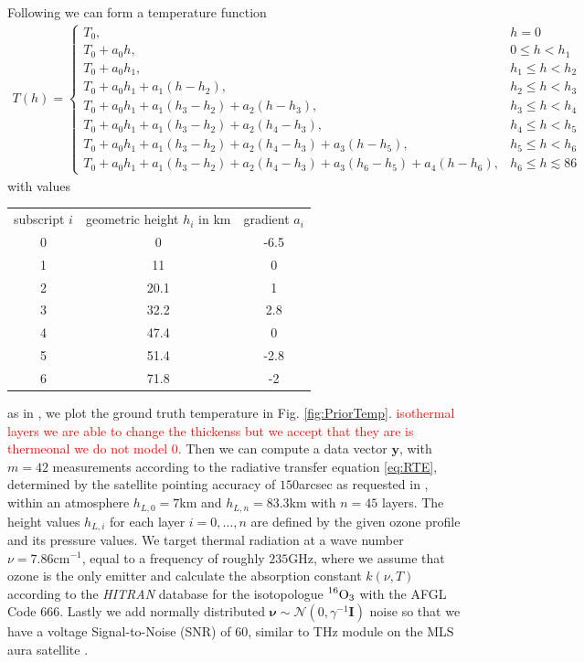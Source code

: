 Following \cite{atmosphere1976us} we can form a temperature function
\begin{align}
	T(h) = \begin{cases*}
		T_0, & \text{$h = 0$}\\
		T_0 + a_0 h , & \text{$0 \leq h < h_{1}$}\\
		T_0 + a_0 h_{1}, & \text{$h_{1} \leq  h < h_{2}$}\\
		T_0 + a_0 h_{1} + a_1 (h   - h_2),  & \text{$h_{2} \leq h < h_{3}$}\\
		T_0 + a_0 h_{1} + a_1 (h_{3} - h_{2}) + a_2 (h   - h_3), & \text{$h_{3} \leq h < h_{4}$}\\
		T_0 + a_0 h_{1} + a_1 (h_{3} - h_{2}) + a_2 (h_{4} - h_{3}), & \text{$h_{4} \leq h < h_{5}$}\\
		T_0 + a_0 h_{1} + a_1 (h_{3} - h_{2}) + a_2 (h_{4} - h_{3}) + a_3 (h   - h_{5}), & \text{$h_{5} \leq h < h_{6}$}\\
		T_0 + a_0 h_{1} + a_1 (h_{3} - h_{2}) + a_2 (h_{4} - h_{3}) + a_3 (h_{6} - h_{5}) + a_4 (h - h_{6}), & \text{$h_{6} \leq h \lesssim 86$}
	\end{cases*} 
	\label{eq:tempFunc}
\end{align}
with values
\begin{tabular}{ |c||c|c|  }
	\hline
	subscript $i$ & geometric height $h_i$ in km&gradient $a_i$\\
	\hhline{|=||=|=|}
	0& 0 & -6.5\\
	1& 11 & 0\\
	2& 20.1& 1\\
	3& 32.2& 2.8\\
	4& 47.4& 0\\
	5& 51.4& -2.8\\
	6& 71.8& -2\\
	\hline
\end{tabular}
as in \cite{atmosphere1976us}, we plot the ground truth temperature in Fig. \ref{fig:PriorTemp}.
\textcolor{red}{isothermal layers we are able to change the thickenss but we accept that they are is thermeonal we do not model 0.}
Then we can compute a data vector $\bm{y}$, with $m = 42$ measurements according to the radiative transfer equation \ref{eq:RTE}, determined by the satellite pointing accuracy of $150$arcsec as requested in \cite{CubeSatInternal}, within an atmosphere $h_{L,0}=7$km and $h_{L,n} = 83.3$km with $n = 45$ layers.
The height values $h_{L,i}$ for each layer $i = 0,\dots, n$ are defined by the given ozone profile and its pressure values.
We target thermal radiation at a wave number $\nu = 7.86\text{cm}^{-1}$, equal to a frequency of roughly $235$GHz, where we assume that ozone is the only emitter and calculate the absorption constant $k(\nu,T)$ according to the \textit{HITRAN} database \cite{gordon2022hitran2020} for the isotopologue $\prescript{16}{}{\text{O}}_3$ with the AFGL Code 666.
Lastly we add normally distributed $\bm{\nu} \sim \mathcal{N}(0,\gamma^{-1} \bm{I})$ noise so that we have a voltage Signal-to-Noise (SNR) of $60$, similar to THz module on the MLS aura satellite \cite{pickett2006snr}.

